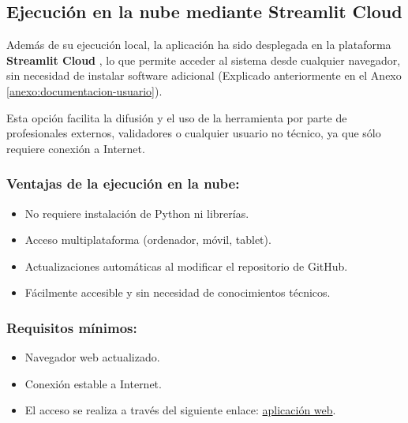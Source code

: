 \subsection{Ejecución en la nube mediante Streamlit Cloud}

Además de su ejecución local, la aplicación ha sido desplegada en la plataforma \textbf{Streamlit Cloud} , lo que permite acceder al sistema desde cualquier navegador, sin necesidad de instalar software adicional (Explicado anteriormente en el Anexo \ref{anexo:documentacion-usuario}).

Esta opción facilita la difusión y el uso de la herramienta por parte de profesionales externos, validadores o cualquier usuario no técnico, ya que sólo requiere conexión a Internet.

\subsubsection{Ventajas de la ejecución en la nube:}

\begin{itemize}
    \item No requiere instalación de Python ni librerías.
    \item Acceso multiplataforma (ordenador, móvil, tablet).
    \item Actualizaciones automáticas al modificar el repositorio de GitHub.
    \item Fácilmente accesible y sin necesidad de conocimientos técnicos.
\end{itemize}

\subsubsection{Requisitos mínimos:}
\begin{itemize}
    \item Navegador web actualizado.
    \item Conexión estable a Internet.
    \item El acceso se realiza a través del siguiente enlace: \href{https://tfg-marina-martin.streamlit.app}{aplicación web}.
    
\end{itemize}



